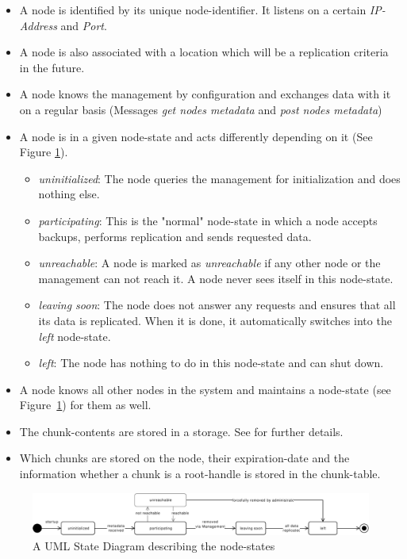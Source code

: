 \begin{itemize}
    \item A \gls{node} is identified by its unique \gls{node-identifier}. It listens on a certain \emph{IP-Address} and \emph{Port}.
    \item A \gls{node} is also associated with a \gls{location} which will be a replication criteria in the future.
    \item A \gls{node} knows the \gls{management} by configuration and exchanges data with it on a regular basis (Messages \emph{get nodes metadata} and \emph{post nodes metadata})
    \item A \gls{node} is in a given \gls{node-state} and acts differently depending on it (See Figure \ref{fig:node-states}).
    \begin{itemize}
        \item \emph{uninitialized}: The \gls{node} queries the \gls{management} for initialization and does nothing else.
        \item \emph{participating}: This is the "normal" \gls{node-state} in which a \gls{node} accepts backups, performs replication and sends requested data.
        \item \emph{unreachable}: A \gls{node} is marked as \emph{unreachable} if any other \gls{node} or the \gls{management} can not reach it. A \gls{node} never sees itself in this \gls{node-state}.
        \item  \emph{leaving soon}: The \gls{node} does not answer any requests and ensures that all its data is replicated. When it is done, it automatically switches into the \emph{left} \gls{node-state}.
        \item \emph{left}: The \gls{node} has nothing to do in this \gls{node-state} and can shut down.
    \end{itemize}
    \item A \gls{node} knows all other \glspl{node} in the \gls{system} and maintains a \gls{node-state} (see Figure~\ref{fig:node-states}) for them as well.
    \item The \glspl{chunk-content} are stored in a \gls{storage}. See  for further details.
    \item Which \glspl{chunk} are stored on the \gls{node}, their \gls{expiration-date} and the information whether a \gls{chunk} is a \gls{root-handle} is stored in the \gls{chunk-table}.
\end{itemize}

\begin{figure}[h]
    \centering
    \includegraphics[width=1\linewidth]{resources/node_state}
    \caption[Node States]{A UML State Diagram describing the \glspl{node-state}}
    \label{fig:node-states}
\end{figure}

